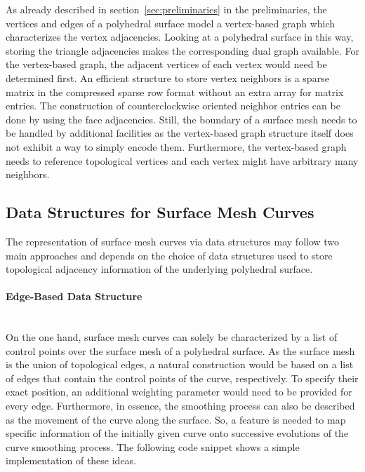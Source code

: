 \documentclass{stdlocal}
\begin{document}
  As already described in section~\ref{sec:preliminaries} in the preliminaries, the vertices and edges of a polyhedral surface model a vertex-based graph which characterizes the vertex adjacencies.
  Looking at a polyhedral surface in this way, storing the triangle adjacencies makes the corresponding dual graph available.
  For the vertex-based graph, the adjacent vertices of each vertex would need be determined first.
  An efficient structure to store vertex neighbors is a sparse matrix in the compressed sparse row format without an extra array for matrix entries.
  The construction of counterclockwise oriented neighbor entries can be done by using the face adjacencies.
  Still, the boundary of a surface mesh needs to be handled by additional facilities as the vertex-based graph structure itself does not exhibit a way to simply encode them.
  Furthermore, the vertex-based graph needs to reference topological vertices and each vertex might have arbitrary many neighbors.


\subsection{Data Structures for Surface Mesh Curves} %
\label{sub:discrete_surface_curve_data_structure}

  The representation of surface mesh curves via data structures may follow two main approaches and depends on the choice of data structures used to store topological adjacency information of the underlying polyhedral surface.

  \paragraph{Edge-Based Data Structure}\hfill\\
  On the one hand, surface mesh curves can solely be characterized by a list of control points over the surface mesh of a polyhedral surface.
  As the surface mesh is the union of topological edges, a natural construction would be based on a list of edges that contain the control points of the curve, respectively.
  To specify their exact position, an additional weighting parameter would need to be provided for every edge.
  Furthermore, in essence, the smoothing process can also be described as the movement of the curve along the surface.
  So, a feature is needed to map specific information of the initially given curve onto successive evolutions of the curve smoothing process.
  The following code snippet shows a simple implementation of these ideas.
\end{document}
